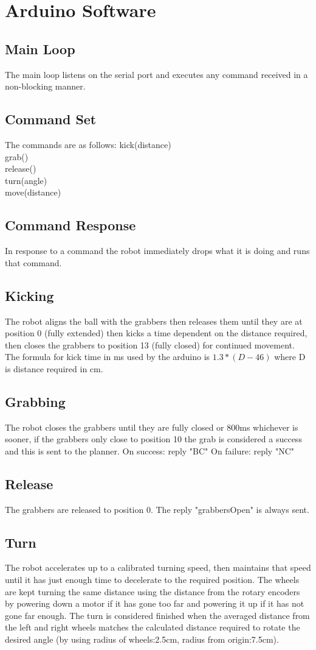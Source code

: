 
\section{Arduino Software}
\subsection{Main Loop}
The main loop listens on the serial port and executes any command received in a non-blocking manner. 
\subsection{Command Set}
The commands are as follows:
kick(distance)\\
grab()\\
release()\\
turn(angle)\\
move(distance)\\
\subsection{Command Response}
In response to a command the robot immediately drops what it is doing and runs that command. 
\subsection{Kicking}
The robot aligns the ball with the grabbers then releases them until they are at position 0 (fully extended) then kicks a time dependent on the distance required, then closes the grabbers to position 13 (fully closed) for continued movement. The formula for kick time in ms used by the arduino is $ 1.3*(D-46) $ where D is distance required in cm. 
\subsection{Grabbing}
The robot closes the grabbers until they are fully closed or 800ms whichever is sooner, if the grabbers only close to position 10 the grab is considered a success and this is sent to the planner. 
On success: reply "BC"
On failure: reply "NC"
\subsection{Release}
The grabbers are released to position 0. The reply "grabbersOpen" is always sent. 
\subsection{Turn}
The robot accelerates up to a calibrated turning speed, then maintains that speed until it has just enough time to decelerate to the required position. The wheels are kept turning the same distance using the distance from the rotary encoders by powering down a motor if it has gone too far and powering it up if it has not gone far enough. The turn is considered finished when the averaged distance from the left and right wheels matches the calculated distance required to rotate the desired angle (by using radius of wheels:2.5cm, radius from origin:7.5cm). 
